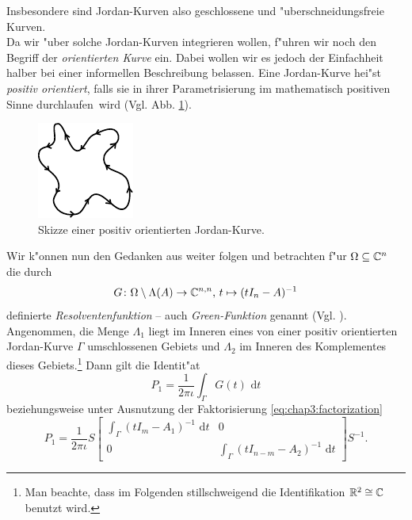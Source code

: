 Insbesondere sind Jordan-Kurven also geschlossene und "uberschneidungsfreie Kurven.\\

Da wir "uber solche Jordan-Kurven integrieren wollen, f"uhren wir noch den Begriff der \emph{orientierten Kurve} ein.
Dabei wollen wir es jedoch der Einfachheit halber bei einer informellen Beschreibung belassen.
Eine Jordan-Kurve hei"st \emph{positiv orientiert},
falls sie in ihrer Parametrisierung im mathematisch positiven Sinne \glqq durchlaufen\grqq\ wird (Vgl. Abb. \ref{im:chap3:jKurveOrientiert}).

\newpage

\begin{figure}[h!]
\center
\includegraphics[width=.27\linewidth]{images/jKurveOrientiert}
\caption{Skizze einer positiv orientierten Jordan-Kurve.}\label{im:chap3:jKurveOrientiert}
\end{figure}




Wir k"onnen nun den Gedanken aus \cite[Abschnitt 4.9]{liesen} weiter folgen und betrachten f"ur $\Omega\subseteq\mathbb{C}^n$ die durch
\[
G\colon\Omega \setminus \Lambda(A) \to\mathbb{C}^{n,n}
\text{, }
t \mapsto (t I_n - A)^{-1}
\]
definierte \emph{Resolventenfunktion} -- auch \emph{Green-Funktion} genannt (Vgl. \cite{polizzi}).
Angenommen, die Menge $\Lambda_1$ liegt im Inneren eines von einer positiv orientierten Jordan-Kurve $\Gamma$ umschlossenen
Gebiets und $\Lambda_2$ im Inneren des Komplementes dieses Gebiets.\footnote{Man beachte, dass im Folgenden stillschweigend die Identifikation $\mathbb{R}^2\cong\mathbb{C}$ benutzt wird.}
Dann gilt die Identit"at
\begin{equation}\label{eq:chap3:kontur}
P_1 = \frac{1}{2\pi\iota}\int_\Gamma G(t)\text{ d}t
\end{equation}
beziehungsweise unter Ausnutzung der Faktorisierung \eqref{eq:chap3:factorization}
\begin{equation}\label{eq:chap3:konturMatrix}
P_1 = \frac{1}{2\pi\iota} S
\begin{bmatrix}
\int_\Gamma (t I_m - A_1)^{-1} \text{ d}t & 0 \\
0 & \int_\Gamma (t I_{n-m} - A_2)^{-1} \text{ d}t
\end{bmatrix} S^{-1}.
\end{equation}

